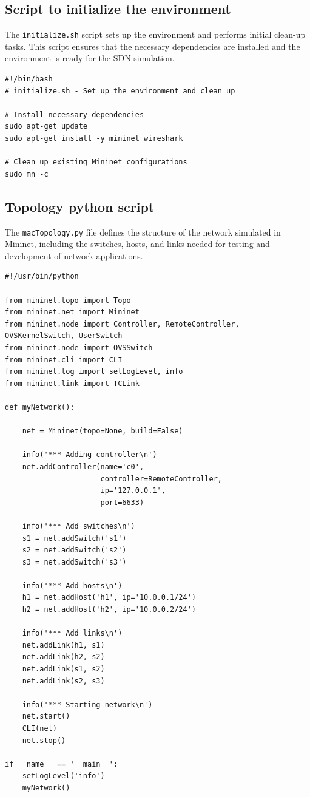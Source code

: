 \documentclass[a4paper,12pt]{article}
\begin{document}
\subsection{Script to initialize the environment}
The \texttt{initialize.sh} script sets up the environment and performs initial clean-up tasks. This script ensures that the necessary dependencies are installed and the environment is ready for the SDN simulation.

\begin{verbatim}
#!/bin/bash
# initialize.sh - Set up the environment and clean up

# Install necessary dependencies
sudo apt-get update
sudo apt-get install -y mininet wireshark

# Clean up existing Mininet configurations
sudo mn -c
\end{verbatim}

\subsection{Topology python script}
The \texttt{macTopology.py} file defines the structure of the network simulated in Mininet, including the switches, hosts, and links needed for testing and development of network applications.

\begin{verbatim}
#!/usr/bin/python

from mininet.topo import Topo
from mininet.net import Mininet
from mininet.node import Controller, RemoteController, OVSKernelSwitch, UserSwitch
from mininet.node import OVSSwitch
from mininet.cli import CLI
from mininet.log import setLogLevel, info
from mininet.link import TCLink

def myNetwork():

    net = Mininet(topo=None, build=False)

    info('*** Adding controller\n')
    net.addController(name='c0',
                      controller=RemoteController,
                      ip='127.0.0.1',
                      port=6633)

    info('*** Add switches\n')
    s1 = net.addSwitch('s1')
    s2 = net.addSwitch('s2')
    s3 = net.addSwitch('s3')

    info('*** Add hosts\n')
    h1 = net.addHost('h1', ip='10.0.0.1/24')
    h2 = net.addHost('h2', ip='10.0.0.2/24')

    info('*** Add links\n')
    net.addLink(h1, s1)
    net.addLink(h2, s2)
    net.addLink(s1, s2)
    net.addLink(s2, s3)

    info('*** Starting network\n')
    net.start()
    CLI(net)
    net.stop()

if __name__ == '__main__':
    setLogLevel('info')
    myNetwork()
\end{verbatim}
\end{document}
